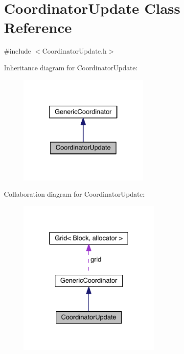 \hypertarget{class_coordinator_update}{}\section{Coordinator\+Update Class Reference}
\label{class_coordinator_update}


{\ttfamily \#include $<$Coordinator\+Update.\+h$>$}



Inheritance diagram for Coordinator\+Update\+:\nopagebreak
\begin{figure}[H]
\begin{center}
\leavevmode
\includegraphics[width=183pt]{dd/d70/class_coordinator_update__inherit__graph}
\end{center}
\end{figure}


Collaboration diagram for Coordinator\+Update\+:\nopagebreak
\begin{figure}[H]
\begin{center}
\leavevmode
\includegraphics[width=200pt]{db/de9/class_coordinator_update__coll__graph}
\end{center}
\end{figure}
